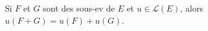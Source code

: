 Si $F$ et $G$ sont des sous-ev de $E$ et $u \in \mathcal L(E)$, alors $u(F+G)=u(F)+u(G)$.

\begin{reponses}
\end{reponses}

